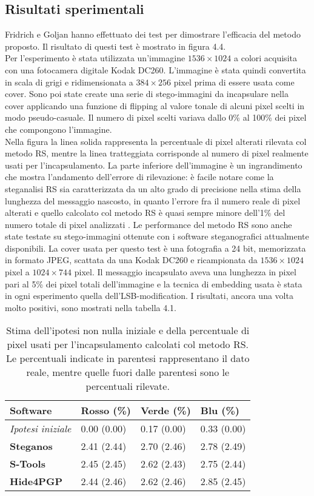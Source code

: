 \subsection{Risultati sperimentali}
Fridrich e Goljan hanno effettuato dei test per dimostrare l'efficacia del metodo proposto. Il risultato di questi test è mostrato in figura 4.4.\\Per l'esperimento è stata utilizzata un'immagine $1536\times 1024$ a colori acquisita con una fotocamera digitale Kodak DC260. L'immagine è stata quindi convertita in scala di grigi e ridimensionata a $384\times 256$ pixel prima di essere usata come cover. Sono poi state create una serie di stego-immagini da incapsulare nella cover applicando una funzione di flipping al valore tonale di alcuni pixel scelti in modo pseudo-casuale. Il numero di pixel scelti variava dallo 0\% al 100\% dei pixel che compongono l'immagine.\\Nella figura la linea solida rappresenta la percentuale di pixel alterati rilevata col metodo RS, mentre la linea tratteggiata corrisponde al numero di pixel realmente usati per l'incapsulamento. La parte inferiore dell'immagine è un ingrandimento che mostra l'andamento dell'errore di rilevazione: è facile notare come la steganalisi RS sia caratterizzata da un alto grado di precisione nella stima della lunghezza del messaggio nascosto, in quanto l'errore fra il numero reale di pixel alterati e quello calcolato col metodo RS è quasi sempre minore dell'1\% del numero totale di pixel analizzati \cite{fried1, fried2, survey}.
\noindent Le performance del metodo RS sono anche state testate su stego-immagini ottenute con i software steganografici attualmente disponibili. La cover usata per questo test è una fotografia a 24 bit, memorizzata in formato JPEG, scattata da una Kodak DC260 e ricampionata da $1536\times 1024$ pixel a $1024\times 744$ pixel. Il messaggio incapsulato aveva una lunghezza in pixel pari al 5\% dei pixel totali dell'immagine e la tecnica di embedding usata è stata in ogni esperimento quella dell'LSB-modification. I risultati, ancora una volta molto positivi, sono mostrati nella tabella 4.1.
\begin{table}[!h]
\centering
\label{tab}
\begin{tabular}{|llll|}
\hline
\textbf{Software}         & \textbf{Rosso (\%)} & \textbf{Verde (\%)} & \textbf{Blu (\%)} \\ \hline
\textit{Ipotesi iniziale} & 0.00 (0.00)         & 0.17 (0.00)         & 0.33 (0.00)       \\ \hline
\textbf{Steganos}         & 2.41 (2.44)         & 2.70 (2.46)         & 2.78 (2.49)       \\
\textbf{S-Tools}          & 2.45 (2.45)         & 2.62 (2.43)         & 2.75 (2.44)       \\
\textbf{Hide4PGP}         & 2.44 (2.46)         & 2.62 (2.46)         & 2.85 (2.45)       \\ \hline
\end{tabular}
\caption{Stima dell'ipotesi non nulla iniziale e della percentuale di pixel usati per l'incapsulamento calcolati col metodo RS. Le percentuali indicate in parentesi rappresentano il dato reale, mentre quelle fuori dalle parentesi sono le percentuali rilevate.}
\end{table}